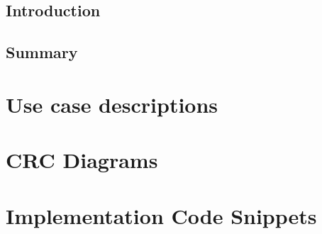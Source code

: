 \documentclass[11pt,oneside]{report}
\newcommand\code[1]{\texttt{#1}}
\begin{document}
	\section{Introduction}
	\section{Summary}
	\clearpage
	
	
	\begin{appendices}
	\chapter{Use case descriptions} \label{app:use_case_descriptions}
			
			
			
			
			
			
			
	\chapter{CRC Diagrams} \label{app:crc_diagrams}
			
			
			
			
	\chapter{Implementation Code Snippets}
			
			
	\end{appendices}
	
\end{document}
